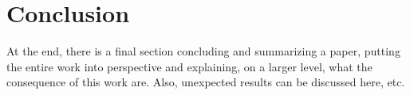 \documentclass[12pt]{article}
\theoremstyle{plain}
\theoremstyle{definition}
\theoremstyle{remark}
\begin{document}
\section{Conclusion}
\label{sec:concl}

At the end, there is a final section concluding and summarizing a
paper, putting the entire work into perspective and explaining, on a
larger level, what the consequence of this work are. Also, unexpected
results can be discussed here, etc.


%
%


\end{document}
